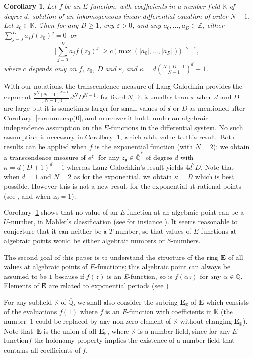 \documentclass[JEP,XML,SOM,Unicode,published]{cedram}
\newcommand{\Efunction}{$E$\nobreakdash-func\-tion\xspace}
\newcommand{\Efunctions}{$E$\nobreakdash-func\-tions\xspace}
\newtheorem{coro}{Corollary}
\theoremstyle{definition}
\newcommand{\Z}{\mathbb{Z}}
\newcommand{\K}{\mathbb{K}}
\newcommand{\EE}{{\mathbf E}}
\newcommand{\Qbar}{\overline{\mathbb Q}}
\newcommand{\EK}{\EE_{\K}}
\let\eps\varepsilon
\begin{document}
\begin{coro} \label{corotrmes}
Let $f$ be an $E$-function, with coefficients in a number field $\mathbb{K}$ of degree $d$, solution of an inhomogeneous linear differential equation of order $N-1$. Let $z_0 \in \mathbb K$. Then for any $D\geq 1$, any $\eps>0$, and any $a_0,\ldots,a_D\in\Z$, either $\sum_{j=0}^D a_j f(z_0)^j=0$~or\vspace*{-3pt}\enlargethispage{.5\baselineskip}
\[
\bigg| \sum_{j=0}^D a_j f(z_0)^j \bigg| \geq c \, \big( \max( |a_0|,\ldots, |a_D|)\big)^{-\kappa-\eps},
\]
where $c$ depends only on $f$, $z_0$, $D$ and $\eps$, and
$\kappa = d \binom{N+D-1}{N-1} ^d -1$.
\end{coro}
With our notations, the transcendence measure of Lang-Galochkin provides the exponent $\frac{2^{N}(N-1)^{N-1}}{(N-1)!}\,d^{N}D^{N-1}$: for fixed $N$, it is smaller than $\kappa$ when $d$ and $D$ are large but it is sometimes larger for small values of $d$ or $D$ as mentioned after Corollary~\ref{coro:mesexpj0}, and moreover it holds under an algebraic independence assumption on the \Efunctions in the differential system. No such assumption is necessary in Corollary~\ref{corotrmes}, which adds value to this result. Both results can be applied when $f$ is the exponential function (with $N=2$): we obtain a transcendence measure of $e^{z_0}$ for any $z_0\in \Qbar^*$ of degree $d$ with $\kappa = d(D+1)^d-1$ whereas Lang-Galochkin's result yields $4d^2D$. Note that when $d=1$ and $N=2$ as for the exponential, we obtain $\kappa=D$ which is best possible. However this is not a new result for the exponential at rational points (see
\cite[Ch.\,10]{baker}, and \cite[p.\,135, Satz\,3]{mahler} when $z_0=1$).

Corollary~\ref{corotrmes} shows that no value of an \Efunction at an algebraic point can be a $U$-number, in Mahler's classification (see for instance \cite[Ch.\,3]{bugeaud}). It seems reasonable to conjecture that it can neither be a $T$-number, so that values of \Efunctions at algebraic points would be either algebraic numbers or $S$-numbers.

The second goal of this paper is to understand the structure of the ring $\EE $ of all values at algebraic points of \Efunctions; this algebraic point can always be assumed to be $1$ because if $f(z)$ is an \Efunction, so is $f(\alpha z)$ for any $\alpha\in \Qbar$. Elements of $\EE$ are related to exponential periods (see \cite[\S 4.3]{fuchsien}).

For any subfield $\mathbb K$ of $\Qbar$, we shall also consider the subring $\EK$ of $\EE$ which consists of the evaluations $f(1)$ where $f$ is an \Efunction with coefficients in $\mathbb K$ (the number~$1$ could be replaced by any non-zero element of $\mathbb K$ without changing $\EK$).
Note that~$\EE$ is the union of all $\EK$, where $\K$ is a number field, since for any \Efunction $f$ the holonomy property implies the existence of a number field that contains all coefficients of $f$.
\end{document}
